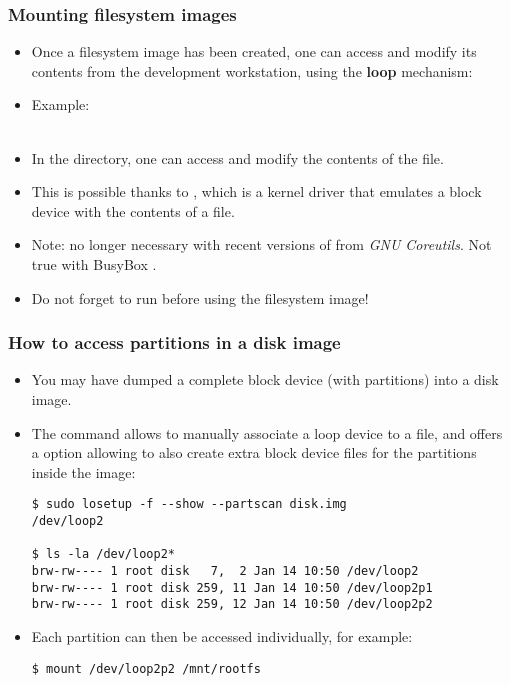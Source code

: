 \begin{frame}
  \frametitle{Mounting filesystem images}
  \begin{itemize}
  \item Once a filesystem image has been created, one can access and
    modify its contents from the development workstation, using the
    {\bf loop} mechanism:
  \item Example:\\
    \\
  \item In the  directory, one can access and modify
    the contents of the  file.
  \item This is possible thanks to , which is a kernel
    driver that emulates a block device with the contents of a file.
  \item Note:  no longer necessary with recent versions
        of  from {\em GNU Coreutils}. Not true with BusyBox
       .
  \item Do not forget to run  before using the filesystem
    image!
  \end{itemize}
\end{frame}

\begin{frame}[fragile]
  \frametitle{How to access partitions in a disk image}
  \begin{itemize}
  \item You may have dumped a complete block device (with partitions) into a disk image.
  \item The  command allows to manually associate
    a loop device to a file, and offers a  option
    allowing to also create extra block device files for the partitions
    inside the image:
    \begin{block}{}
    \begin{verbatim}
$ sudo losetup -f --show --partscan disk.img
/dev/loop2

$ ls -la /dev/loop2*
brw-rw---- 1 root disk   7,  2 Jan 14 10:50 /dev/loop2
brw-rw---- 1 root disk 259, 11 Jan 14 10:50 /dev/loop2p1
brw-rw---- 1 root disk 259, 12 Jan 14 10:50 /dev/loop2p2
\end{verbatim}
    \end{block}{}
  \item Each partition can then be accessed individually, for example:
    \begin{block}{}
    \begin{verbatim}
$ mount /dev/loop2p2 /mnt/rootfs
\end{verbatim}
    \end{block}{}
  \end{itemize}
\end{frame}

